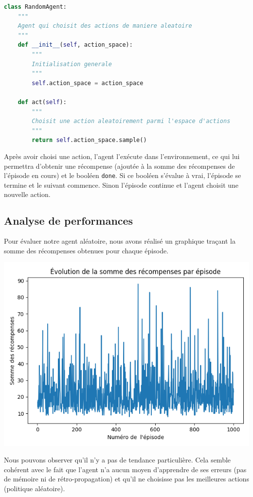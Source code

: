 \documentclass[10pt,a4paper]{article}
\begin{document}
\begin{lstlisting}[language=Python, caption=Implémentation de l'agent aléatoire]
class RandomAgent:
    """
    Agent qui choisit des actions de maniere aleatoire
    """
    def __init__(self, action_space):
        """
        Initialisation generale
        """
        self.action_space = action_space

    def act(self):
        """
        Choisit une action aleatoirement parmi l'espace d'actions
        """
        return self.action_space.sample()
\end{lstlisting}
Après avoir choisi une action, l'agent l'exécute dans l'environnement, ce qui lui permettra d'obtenir une récompense (ajoutée à la somme des récompenses de l'épisode en cours) et le booléen \lstinline{done}. Si ce booléen s'évalue à vrai, l'épisode se termine et le suivant commence. Sinon l'épisode continue et l'agent choisit une nouvelle action.

\subsection{Analyse de performances}

Pour évaluer notre agent aléatoire, nous avons réalisé un graphique traçant la somme des récompenses obtenues pour chaque épisode.

\includegraphics[scale=0.5]{evolution_recompenses_random.png} 

Nous pouvons observer qu'il n'y a pas de tendance particulière. Cela semble cohérent avec le fait que l'agent n'a aucun moyen d'apprendre de ses erreurs (pas de mémoire ni de rétro-propagation) et qu'il ne choisisse pas les meilleures actions (politique aléatoire).
\end{document}
